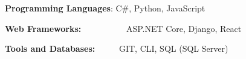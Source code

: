 \textbf{Programming Languages}: C\#, Python, JavaScript

\textbf{Web Frameworks:} ~~~~~~~~~~ASP.NET Core, Django, React

\textbf{Tools and Databases:} ~~~~~GIT, CLI, SQL (SQL Server)